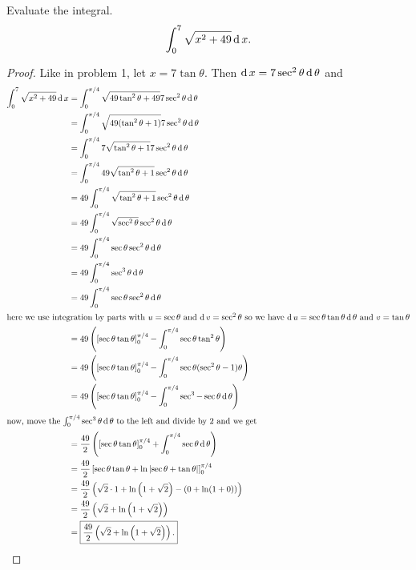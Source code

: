 \begin{problem}[WebAssign, HW 11, \#5]
Evaluate the integral.
\[
\int_0^7\sqrt{x^2+49}\operatorname{d} x.
\]
\end{problem}
\begin{proof}
Like in problem 1, let $x=7\tan\theta$. Then $\operatorname{d}
x=7\sec^2\theta\operatorname{d}\theta$ and
\begingroup
\allowdisplaybreaks
\begin{align*}
\int_0^7\sqrt{x^2+49}\operatorname{d} x
&=\int_0^{\pi/4}\sqrt{49\tan^2\theta+49}7\sec^2\theta\operatorname{d}\theta\\
&=\int_0^{\pi/4}\sqrt{49(\tan^2\theta+1)}7\sec^2\theta\operatorname{d}\theta\\
&=\int_0^{\pi/4}7\sqrt{\tan^2\theta+1}7\sec^2\theta\operatorname{d}\theta\\
&=\int_0^{\pi/4}49\sqrt{\tan^2\theta+1}\sec^2\theta\operatorname{d}\theta\\
&=49\int_0^{\pi/4}\sqrt{\tan^2\theta+1}\sec^2\theta\operatorname{d}\theta\\
&=49\int_0^{\pi/4}\sqrt{\sec^2\theta}\sec^2\theta\operatorname{d}\theta\\
&=49\int_0^{\pi/4}\sec\theta\sec^2\theta\operatorname{d}\theta\\
&=49\int_0^{\pi/4}\sec^3\theta\operatorname{d}\theta\\
&=49\int_0^{\pi/4}\sec\theta\sec^2\theta\operatorname{d}\theta\\
\intertext{here we use integration by parts with $u=\sec\theta$ and
  $\operatorname{d} v=\sec^2\theta$ so we have $\operatorname{d}
  u=\sec\theta\tan\theta\operatorname{d}\theta$ and $v=\tan\theta$}
&=49\left(\left[\sec\theta\tan\theta\right]_0^{\pi/4}
  -\int_0^{\pi/4}\sec\theta\tan^2\theta\right)\\
&=49\left(\left[\sec\theta\tan\theta\right]_0^{\pi/4}
  -\int_0^{\pi/4}\sec\theta(\sec^2\theta-1)\theta\right)\\
&=49\left(\left[\sec\theta\tan\theta\right]_0^{\pi/4}
  -\int_0^{\pi/4}\sec^3-\sec\theta\operatorname{d}\theta\right)\\
\intertext{now, move the $\int_0^{\pi/4}\sec^3\theta\operatorname{d}\theta$ to the
  left and divide by $2$ and we get}
&=\frac{49}{2}\left(\left[\sec\theta\tan\theta\right]_0^{\pi/4}
  +\int_0^{\pi/4}\sec\theta\operatorname{d}\theta\right)\\
&=\frac{49}{2}\left[\sec\theta\tan\theta+\ln\left|\sec\theta+\tan\theta\right|\right]_0^{\pi/4}\\
&=\frac{49}{2}\left(\sqrt{2}\cdot 1+\ln\left(1+\sqrt{2}\right)-(0+\ln(1+0))\right)\\
&=\frac{49}{2}\left(\sqrt{2}+\ln\left(1+\sqrt{2}\right)\right)\\
&=\boxed{\frac{49}{2}\left(\sqrt{2}+\ln\left(1+\sqrt{2}\right)\right).}\qedhere
\end{align*}
\endgroup
\end{proof}
